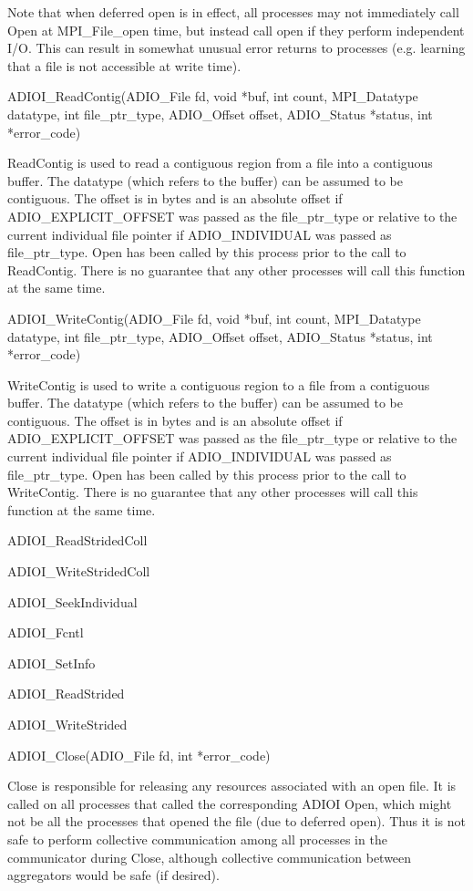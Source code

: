 Note that when deferred open is in effect, all processes may not immediately
call Open at MPI\_File\_open time, but instead call open if they perform
independent I/O.  This can result in somewhat unusual error returns to
processes (e.g. learning that a file is not accessible at write time).

ADIOI\_ReadContig(ADIO\_File fd, void *buf, int count, MPI\_Datatype datatype,
int file\_ptr\_type, ADIO\_Offset offset, ADIO\_Status *status, int *error\_code)

ReadContig is used to read a contiguous region from a file into a contiguous
buffer.  The datatype (which refers to the buffer) can be assumed to be
contiguous.  The offset is in bytes and is an absolute offset if
ADIO\_EXPLICIT\_OFFSET was passed as the file\_ptr\_type or relative to the
current individual file pointer if ADIO\_INDIVIDUAL was passed as
file\_ptr\_type.  Open has been called by this process prior to the call to
ReadContig.  There is no guarantee that any other processes will call this
function at the same time.

ADIOI\_WriteContig(ADIO\_File fd, void *buf, int count, MPI\_Datatype datatype,
int file\_ptr\_type, ADIO\_Offset offset, ADIO\_Status *status, int *error\_code)

WriteContig is used to write a contiguous region to a file from a contiguous
buffer.  The datatype (which refers to the buffer) can be assumed to be
contiguous.  The offset is in bytes and is an absolute offset if
ADIO\_EXPLICIT\_OFFSET was passed as the file\_ptr\_type or relative to the
current individual file pointer if ADIO\_INDIVIDUAL was passed as
file\_ptr\_type.  Open has been called by this process prior to the call to
WriteContig.  There is no guarantee that any other processes will call this
function at the same time.

ADIOI\_ReadStridedColl

ADIOI\_WriteStridedColl

ADIOI\_SeekIndividual

ADIOI\_Fcntl

ADIOI\_SetInfo

ADIOI\_ReadStrided

ADIOI\_WriteStrided

ADIOI\_Close(ADIO\_File fd, int *error\_code)

Close is responsible for releasing any resources associated with an open file.
It is called on all processes that called the corresponding ADIOI Open, which
might not be all the processes that opened the file (due to deferred open).
Thus it is not safe to perform collective communication among all processes in
the communicator during Close, although collective communication between
aggregators would be safe (if desired).

